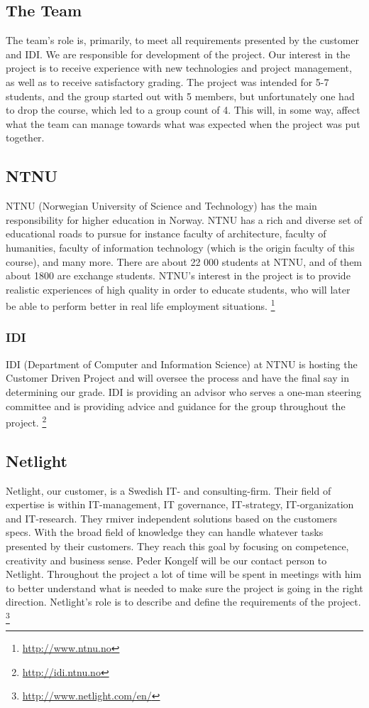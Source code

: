 \subsection{The Team}
The team's role is, primarily, to meet all requirements presented by the customer and IDI. We are responsible for development of the project. Our interest in the project is to receive experience with new technologies and project management, as well as to receive satisfactory grading.
The project was intended for 5-7 students, and the group started out with 5 members, but unfortunately one had to drop the course, which led to a group count of 4. This will, in some way, affect what the team can manage towards what was expected when the project was put together.

\subsection{NTNU}
\label{NTNU}
NTNU (Norwegian University of Science and Technology) has the main responsibility for higher education in Norway. NTNU has a rich and diverse set of educational roads to pursue for instance faculty of architecture, faculty of humanities, faculty of information technology (which is the origin faculty of this course), and many more. There are about 22 000 students at NTNU, and of them about 1800 are exchange students. NTNU’s interest in the project is to provide realistic experiences of high quality in order to educate students, who will later be able to perform better in real life employment situations.
\footnote{\url{http://www.ntnu.no}}

\subsubsection{IDI}
IDI (Department of Computer and Information Science) at NTNU is hosting the Customer Driven Project and will oversee the process and have the final say in determining our grade. IDI is providing an advisor who serves a one-man steering committee and is providing advice and guidance for the group throughout the project.
\footnote{\url{http://idi.ntnu.no}}

\subsection{Netlight}
Netlight, our customer, is a Swedish IT- and consulting-firm. Their field of expertise is within IT-management, IT governance, IT-strategy, IT-organization and IT-research. They rmiver independent solutions based on the customers specs. With the broad field of knowledge they can handle whatever tasks presented by their customers. They reach this goal by focusing on competence, creativity and business sense.
Peder Kongelf will be our contact person to Netlight. Throughout the project a lot of time will be spent in meetings with him to better understand what is needed to make sure the project is going in the right direction. Netlight's role is to describe and define the requirements of the project.
\footnote{\url{http://www.netlight.com/en/}}

